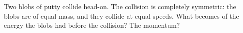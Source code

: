 Two blobs of putty collide head-on. The collision is completely symmetric: the blobs are
of equal mass, and they collide at equal speeds. What becomes of the energy the blobs
had before the collision? The momentum?
